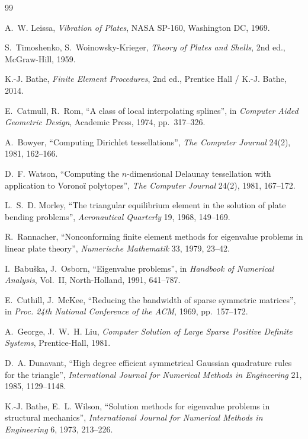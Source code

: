 \documentclass[11pt,a4paper]{article}
\begin{document}
\begin{thebibliography}{99}

 A.~W. Leissa, \emph{Vibration of Plates}, NASA SP-160,
  Washington DC, 1969.

 S.~Timoshenko, S.~Woinowsky-Krieger, \emph{Theory of
  Plates and Shells}, 2nd ed., McGraw-Hill, 1959.

 K.-J. Bathe, \emph{Finite Element Procedures}, 2nd ed.,
  Prentice Hall / K.-J. Bathe, 2014.

 E.~Catmull, R.~Rom, ``A class of local interpolating
  splines'', in \emph{Computer Aided Geometric Design}, Academic Press,
  1974, pp.~317--326.

 A.~Bowyer, ``Computing Dirichlet tessellations'',
  \emph{The Computer Journal} 24(2), 1981, 162--166.

 D.~F. Watson, ``Computing the $n$-dimensional Delaunay
  tessellation with application to Vorono\"i polytopes'', \emph{The
  Computer Journal} 24(2), 1981, 167--172.

 L.~S.~D. Morley, ``The triangular equilibrium element in
  the solution of plate bending problems'', \emph{Aeronautical Quarterly}
  19, 1968, 149--169.

 R.~Rannacher, ``Nonconforming finite element methods
  for eigenvalue problems in linear plate theory'', \emph{Numerische
  Mathematik} 33, 1979, 23--42.

 I.~Babu\v{s}ka, J.~Osborn, ``Eigenvalue
  problems'', in \emph{Handbook of Numerical Analysis}, Vol.~II,
  North-Holland, 1991, 641--787.

 E.~Cuthill, J.~McKee, ``Reducing the bandwidth of
  sparse symmetric matrices'', in \emph{Proc. 24th National Conference of
  the ACM}, 1969, pp.~157--172.

 A.~George, J.~W.~H. Liu, \emph{Computer Solution of
  Large Sparse Positive Definite Systems}, Prentice-Hall, 1981.

 D.~A. Dunavant, ``High degree efficient symmetrical
  Gaussian quadrature rules for the triangle'', \emph{International
  Journal for Numerical Methods in Engineering} 21, 1985, 1129--1148.

 K.-J. Bathe, E.~L. Wilson, ``Solution methods for
  eigenvalue problems in structural mechanics'', \emph{International
  Journal for Numerical Methods in Engineering} 6, 1973, 213--226.


\end{thebibliography}
\end{document}
